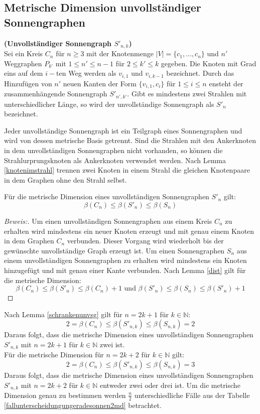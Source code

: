 \subsection{Metrische Dimension unvollständiger Sonnengraphen}  	
\label{chap_usonne} 
\begin{defi}{\textbf{(Unvollständiger Sonnengraph $S'_{n,k}$)}}\\
Sei ein Kreis $C_n$ für $n \geq 3$ mit der Knotenmenge $|V|=\{ c_1, \ldots , c_n \}$ und $n'$ Weggraphen $P_{k'}$ mit $1 \leq n' \leq n-1$ für $2 \leq k' \leq k$ gegeben. Die Knoten mit Grad eins auf dem $i-$ten Weg werden als $v_{i,1}$ und $v_{i,k-1}$ bezeichnet. Durch das Hinzufügen von $n'$ neuen Kanten der Form $\{v_{i,1},c_i\}$ für $1 \leq i \leq n$ ensteht der zusammenhängende Sonnengraph $S'_{n',k'}$. Gibt es mindestens zwei Strahlen mit unterschiedlicher Länge, so wird der unvollständige Sonnengraph als $S'_n$ bezeichnet. 
\end{defi}
\begin{bem}
Jeder unvollständige Sonnengraph ist ein Teilgraph eines Sonnengraphen und wird von dessen metrische Basis getrennt. Sind die Strahlen mit den Ankerknoten in dem unvollständigen Sonnengraphen nicht vorhanden, so können die Strahlurprungsknoten als Ankerknoten verwendet werden. Nach Lemma \ref{knotenimstrahl} trennen zwei Knoten in einem Strahl die gleichen Knotenpaare in dem Graphen ohne den Strahl selbst.
\end{bem}
\begin{lem}
\label{schrankenunvsg}
Für die metrische Dimension eines unvollständigen Sonnengraphen $S'_{n}$ gilt:
$$\beta(C_n) \leq \beta(S'_{n})\leq \beta(S_{n})$$
\end{lem}
\begin{proof}[Beweis:]
Um einen unvollständigen Sonnengraphen aus einem Kreis $C_n$ zu erhalten wird mindestens ein neuer Knoten erzeugt und mit genau einem Knoten in dem Graphen $C_n$ verbunden. Dieser Vorgang wird wiederholt bis der gewünschte unvollständige Graph erzeugt ist. Um einen Sonnengraphen $S_{n}$ aus einem unvollständigen Sonnengraphen zu erhalten wird mindestens ein Knoten hinzugefügt und mit genau einer Kante verbunden. Nach Lemma \ref{dist} gilt für die metrische Dimension:
$$\beta(C_n)  \leq \beta(S'_{n}) \leq \beta(C_n) +1 \text{ und } \beta(S'_{n}) \leq \beta(S_n) \leq \beta(S'_{n})+1$$
\end{proof}
\begin{bem}
Nach Lemma \ref{schrankenunvsg} gilt für $n=2k+1$ für $k \in \mathbb{N}$: $$2=\beta(C_n) \leq \beta(S'_{n,k})\leq \beta(S_{n,k})=2$$
Daraus folgt, dass die metrische Dimension eines unvollständigen Sonnengraphen $S'_{n,k}$ mit $n=2k+1$ für $k \in \mathbb{N}$ zwei ist.\\
Für die metrische Dimension für $n=2k+2$ für $k \in \mathbb{N}$ gilt: $$2=\beta(C_n) \leq \beta(S'_{n,k})\leq \beta(S_{n,k})=3$$
Daraus folgt, dass die metrische Dimension eines unvollständigen Sonnengraphen $S'_{n,k}$ mit $n=2k+2$ für $k \in \mathbb{N}$ entweder zwei oder drei ist. Um die metrische Dimension genau zu bestimmen werden $\frac{n}{2}$ unterschiedliche Fälle aus der Tabelle \ref{fallunterscheidungungeradesonnen2md} betrachtet.
\end{bem}

